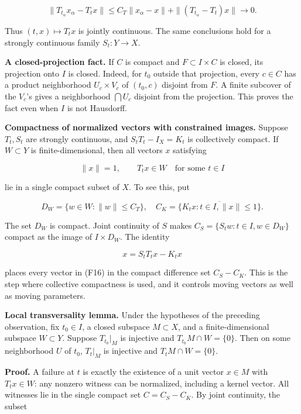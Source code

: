 \documentclass[
  11pt,
]{article}
\begin{document}
\[
\|T_{t_\alpha}x_\alpha-T_tx\|
\leq C_T\|x_\alpha-x\|+\|(T_{t_\alpha}-T_t)x\|\longrightarrow0. \tag{F15}
\]

Thus \((t,x)\mapsto T_tx\) is jointly continuous. The same conclusions
hold for a strongly continuous family \(S_t:Y\to X\).

\textbf{A closed-projection fact.} If \(C\) is compact and
\(F\subset I\times C\) is closed, its projection onto \(I\) is closed.
Indeed, for \(t_0\) outside that projection, every \(c\in C\) has a
product neighborhood \(U_c\times V_c\) of \((t_0,c)\) disjoint from
\(F\). A finite subcover of the \(V_c\)'s gives a neighborhood
\(\bigcap U_c\) disjoint from the projection. This proves the fact even
when \(I\) is not Hausdorff.

\textbf{Compactness of normalized vectors with constrained images.}
Suppose \(T_t,S_t\) are strongly continuous, and \(S_tT_t-I_X=K_t\) is
collectively compact. If \(W\subset Y\) is finite-dimensional, then all
vectors \(x\) satisfying

\[
\|x\|=1,\qquad T_tx\in W\quad\text{for some }t\in I             \tag{F16}
\]

lie in a single compact subset of \(X\). To see this, put

\[
D_W=\{w\in W:\|w\|\leq C_T\},\quad
C_K=\overline{\{K_tx:t\in I,\|x\|\leq1\}}.
\]

The set \(D_W\) is compact. Joint continuity of \(S\) makes
\(C_S=\{S_tw:t\in I,w\in D_W\}\) compact as the image of
\(I\times D_W\). The identity

\[
x=S_tT_tx-K_tx                                                \tag{F17}
\]

places every vector in (F16) in the compact difference set \(C_S-C_K\).
This is the step where collective compactness is used, and it controls
moving vectors as well as moving parameters.

\textbf{Local transversality lemma.} Under the hypotheses of the
preceding observation, fix \(t_0\in I\), a closed subspace
\(M\subset X\), and a finite-dimensional subspace \(W\subset Y\).
Suppose \(T_{t_0}|_M\) is injective and \(T_{t_0}M\cap W=\{0\}\). Then
on some neighborhood \(U\) of \(t_0\), \(T_t|_M\) is injective and
\(T_tM\cap W=\{0\}\).

\textbf{Proof.} A failure at \(t\) is exactly the existence of a unit
vector \(x\in M\) with \(T_tx\in W\): any nonzero witness can be
normalized, including a kernel vector. All witnesses lie in the single
compact set \(C=C_S-C_K\). By joint continuity, the subset
\end{document}
